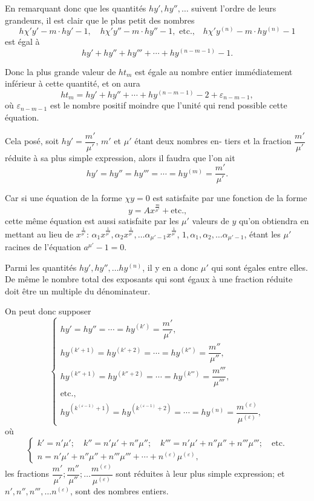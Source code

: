 \documentclass{article}
\begin{document}
En remarquant donc que les quantités $hy', hy'', \ldots$ suivent l'ordre de leurs grandeurs, il est clair que le plus petit des nombres
\[ h\chi' y' - m \cdot hy' - 1, \quad h\chi' y'' - m \cdot hy'' - 1, \text{ etc.,} \quad h\chi' y^{(n)} - m \cdot hy^{(n)} - 1 \]
est égal à
\[ hy' + hy'' + hy''' + \cdots + hy^{(n-m-1)} - 1. \]

Donc la plus grande valeur de $ht_m$ est égale au nombre entier immédiatement inférieur à cette quantité, et on aura
\[ ht_m = hy' + hy'' + \cdots + hy^{(n-m-1)} - 2 + \varepsilon_{n-m-1}, \tag{53} \]
où $\varepsilon_{n-m-1}$ est le nombre positif moindre que l'unité qui rend possible cette équation.

Cela posé, soit $hy' = \dfrac{m'}{\mu'}$, $m'$ et $\mu'$ étant deux nombres en-
tiers et la fraction $\dfrac{m'}{\mu'}$ réduite à sa plus simple expression, alors il faudra que l'on ait
\[ hy' = hy'' = hy''' = \cdots = hy^{(m)} = \frac{m'}{\mu'}. \]

Car si une équation de la forme $\chi y = 0$ est satisfaite par une fonction de la forme
\[ y = A x^{\frac{m}{\mu'}} + \text{etc.,} \]
cette même équation est aussi satisfaite par les $\mu'$ valeurs de $y$ qu'on obtiendra en mettant au lieu de $x^{\frac{1}{\mu'}}$: $\alpha_1 x^{\frac{1}{\mu'}}, \alpha_2 x^{\frac{1}{\mu'}}, \ldots \alpha_{\mu'-1} x^{\frac{1}{\mu'}}$, $1, \alpha_1, \alpha_2, \ldots \alpha_{\mu'-1}$, étant les $\mu'$ racines de l'équation $a^{\mu'} - 1 = 0$.

Parmi les quantités $hy', hy'', \ldots hy^{(n)}$, il y en a donc $\mu'$ qui sont égales entre elles. De même le nombre total des exposants qui sont égaux à une fraction réduite doit être un multiple du dénominateur.

On peut donc supposer
\[ \begin{cases}
hy' = hy'' = \cdots = hy^{(k')} = \dfrac{m'}{\mu'}, \\
hy^{(k'+1)} = hy^{(k'+2)} = \cdots = hy^{(k'')} = \dfrac{m''}{\mu''}, \\
hy^{(k''+1)} = hy^{(k''+2)} = \cdots = hy^{(k''')} = \dfrac{m'''}{\mu'''}, \\
\text{etc.,} \\
hy^{(k^{(\varepsilon-1)}+1)} = hy^{(k^{(\varepsilon-1)}+2)} = \cdots = hy^{(n)} = \dfrac{m^{(\varepsilon)}}{\mu^{(\varepsilon)}},
\end{cases} \tag{54} \]
où
\[ \begin{cases} k' = n'\mu'; \quad k'' = n'\mu' + n''\mu''; \quad k''' = n'\mu' + n''\mu'' + n'''\mu'''; \quad \text{etc.} \\ n = n'\mu' + n''\mu'' + n'''\mu''' + \cdots + n^{(\varepsilon)}\mu^{(\varepsilon)}, \end{cases} \tag{55} \]
les fractions $\dfrac{m'}{\mu'}; \dfrac{m''}{\mu''}; \ldots \dfrac{m^{(\varepsilon)}}{\mu^{(\varepsilon)}}$ sont réduites à leur plus simple expression; et $n', n'', n''', \ldots n^{(\varepsilon)}$, sont des nombres entiers.
\end{document}
